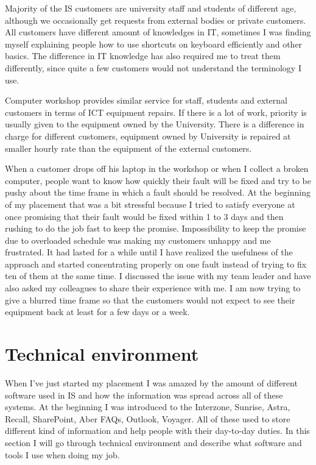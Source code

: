 \documentclass[10pt,a4paper,headinclude=true]{report}
\begin{document}
Majority of the IS customers are university staff and students of different age, although we occasionally get requests from external bodies or private customers. All customers have different amount of knowledges in IT, sometimes I was finding myself explaining people how to use shortcuts on keyboard efficiently and other basics. The difference in IT knowledge has also required me to treat them differently, since quite a few customers would not understand the terminology I use.  

Computer workshop provides similar service for staff, students and external customers in terms of ICT equipment repairs. If there is a lot of work, priority is usually given to the equipment owned by the University. There is a difference in charge for different customers, equipment owned by University is repaired at smaller hourly rate than the equipment of the external customers.

When a customer drops off his laptop in the workshop or when I collect a broken computer, people want to know how quickly their fault will be fixed and try to be pushy about the time frame in which a fault should be resolved. At the beginning of my placement that was a bit stressful because I tried to satisfy everyone at once promising that their fault would be fixed within 1 to 3 days and then rushing to do the job fast to keep the promise. Impossibility to keep the promise due to overloaded schedule was making my customers unhappy and me frustrated. It had lasted for a while until I have realized the usefulness of the approach and started concentrating properly on one fault instead of trying to fix ten of them at the same time. I discussed the issue with my team leader and have also asked my colleagues to share their experience with me. I am now trying to give a blurred time frame so that the customers would not expect to see their equipment back at least for a few days or a week. 

\chapter{Technical environment}
When I've just started my placement I was amazed by the amount of different software used in IS and how the information was spread across all of these systems. At the beginning I was introduced to the Interzone, Sunrise, Astra, Recall, SharePoint, Aber FAQs, Outlook, Voyager. All of these used to store different kind of information and help people with their day-to-day duties. In this section I will go through technical environment and describe what software and tools I use when doing my job.
  
\end{document}
